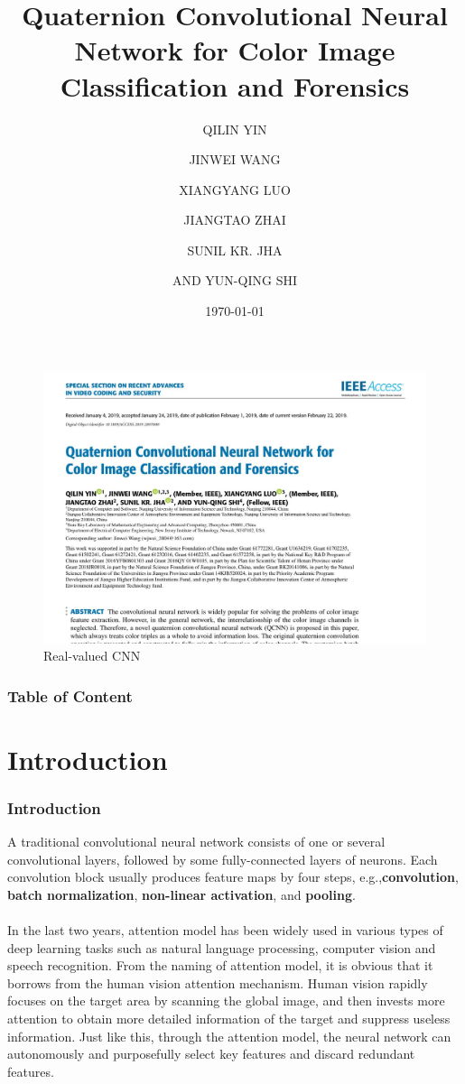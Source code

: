\documentclass{beamer}
\title{Quaternion Convolutional Neural Network for
Color Image Classification and Forensics}
\author{QILIN YIN\and JINWEI WANG \and  XIANGYANG LUO\and JIANGTAO ZHAI \and SUNIL KR. JHA \and AND YUN-QING SHI}
\date{\today}
\begin{document}
\begin{frame}
    \titlepage
\end{frame}
\begin{frame}
    \begin{figure}[H]
        \centering
        \includegraphics[width=\textwidth]{img/1.jpg}
        \caption{Real-valued CNN}
    \end{figure}
\end{frame}
\begin{frame}
    \frametitle{Table of Content}
    \tableofcontents
\end{frame}
\section{Introduction}
\begin{frame}
    \frametitle{Introduction}
A traditional convolutional neural network consists of one or several convolutional layers, followed by some fully-connected layers of neurons. Each convolution block usually produces feature maps by four steps, e.g.,\textbf{convolution}, \textbf{batch normalization}, \textbf{non-linear activation}, and \textbf{pooling}.
\\~\\
In the last two years, attention model has been widely used in various types of deep learning tasks such as natural language processing, computer vision and speech recognition. From the naming of attention model, it is obvious that it borrows from the human vision attention mechanism. Human vision rapidly focuses on the target area by scanning the global image, and then invests more attention to obtain more detailed information of the target and suppress useless information. Just like this, through the attention model, the neural network can autonomously and purposefully select key features and discard redundant features.
\end{frame}
\end{document}
